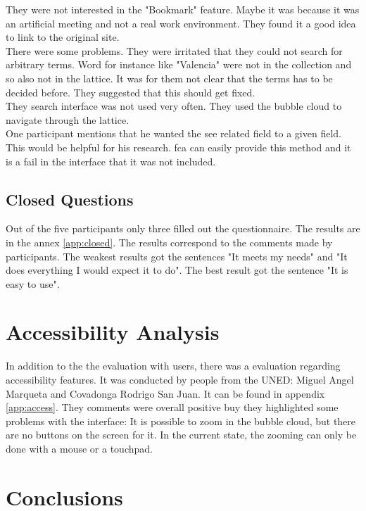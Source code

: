 \documentclass[11pt]{report}
\begin{document}
They were not interested in the "Bookmark" feature. Maybe it was because it was an artificial meeting and not a real work environment. They found it a good idea to link to the original site. \\

There were some problems. They were irritated that they could not search for arbitrary terms. Word for instance like "Valencia" were not in the collection and so also not in the lattice. It was for them not clear that the terms has to be decided before. They suggested that this should get fixed. \\

They search interface was not used very often. They used the bubble cloud to navigate through the lattice. \\

One participant mentions that he wanted the see related field to a given field. This would be helpful for his research. \acrshort{fca} can easily provide this method and it is a fail in the interface that it was not included.\\

\subsection{Closed Questions}

Out of the five participants only three filled out the questionnaire. The results are in the annex \ref{app:closed}. The results correspond to the comments made by participants. The weakest results got the sentences "It meets my needs" and "It does everything I would expect it to do". The best result got the sentence "It is easy to use".

\section{Accessibility Analysis}

In addition to the the evaluation with users, there was a evaluation regarding accessibility features. It was conducted by people from the UNED: Miguel Angel Marqueta and Covadonga Rodrigo San Juan. It can be found in appendix \ref{app:access}. They comments were overall positive buy they highlighted some problems with the interface: It is possible to zoom in the bubble cloud, but there are no buttons on the screen for it. In the current state, the zooming can only be done with a mouse or a touchpad. 

\section{Conclusions}
\end{document}
